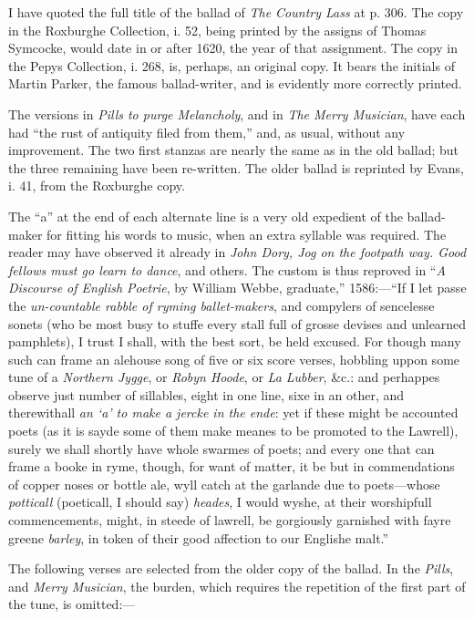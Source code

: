 I have quoted the full title of the ballad of \textit{The Country Lass} at p. 306. The
copy in the Roxburghe Collection, i. 52, being printed by the assigns of Thomas
Symcocke, would date in or after 1620, the year of that assignment. The copy in
the Pepys Collection, i. 268, is, perhaps, an original copy. It bears the initials
of Martin Parker, the famous ballad-writer, and is evidently more correctly
printed.

The versions in \textit{ Pills to purge Melancholy}, and in \textit{The Merry Musician}, have each
had “the rust of antiquity filed from them,” and, as usual, without any improvement. 
The two first stanzas are nearly the same as in the old ballad; but the
three remaining have been re-written. The older ballad is reprinted by Evans,
i. 41, from the Roxburghe copy.

The “a” at the end of each alternate line is a very old expedient of the
ballad-maker for fitting his words to music, when an extra syllable was required.
The reader may have observed it already in \textit{John Dory, Jog on the footpath way.
Good fellows must go learn to dance}, and others. The custom is thus reproved in
“\textit{A Discourse of English Poetrie}, by William Webbe, graduate,” 1586:—“If
I let passe the \textit{un-countable rabble of ryming ballet-makers}, and compylers of
sencelesse sonets (who be most busy to stuffe every stall full of grosse devises
and unlearned pamphlets), I trust I shall, with the best sort, be held excused.
For though many such can frame an alehouse song of five or six score verses,
hobbling uppon some tune of a \textit{Northern Jygge}, or \textit{Robyn Hoode}, or \textit{La
Lubber}, \&c.: and perhappes observe just number of sillables, eight in one
line, sixe in an other, and therewithall\textit{ an ‘a’ to make a jercke in the ende}: yet
if these might be accounted poets (as it is sayde some of them make meanes to
be promoted to the Lawrell), surely we shall shortly have whole swarmes of
poets; and every one that can frame a booke in ryme, though, for want of
matter, it be but in commendations of copper noses or bottle ale, wyll catch at \pagebreak
the garlande due to poets—whose \textit{potticall} (poeticall, I should say) \textit{heades},
I would wyshe, at their worshipfull commencements, might, in steede of lawrell,
be gorgiously garnished with fayre greene \textit{barley}, in token of their good affection
to our Englishe malt.”

The following verses are selected from the older copy of the ballad. In the
\textit{Pills}, and \textit{Merry Musician}, the burden, which requires the repetition of the first
part of the tune, is omitted:—

